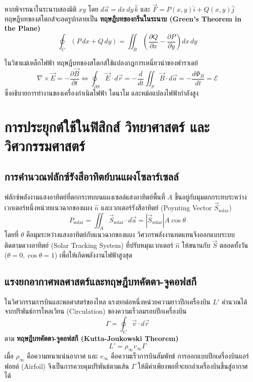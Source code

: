 หากพิจารณาในระนาบสองมิติ $xy$ โดย $d\vec{a} = dx\,dy\,\hat{k}$ และ $\vec{F} = P(x, y)\hat{i} + Q(x, y)\hat{j}$ ทฤษฎีบทของสโตกส์จะลดรูปกลายเป็น \textbf{ทฤษฎีบทของกรีนในระนาบ (Green's Theorem in the Plane)}
\begin{equation}
\oint_C (P\,dx + Q\,dy) = \iint_R \left(\frac{\partial Q}{\partial x} - \frac{\partial P}{\partial y}\right) dx\,dy
\end{equation}

ในวิชาแม่เหล็กไฟฟ้า ทฤษฎีบทของสโตกส์ใช้แปลงกฎการเหนี่ยวนำของฟาราเดย์
\begin{equation}
\nabla \times \vec{E} = -\frac{\partial \vec{B}}{\partial t} \iff \oint_{\partial S} \vec{E} \cdot d\vec{r} = -\frac{d}{dt}\iint_S \vec{B} \cdot d\vec{a} = -\frac{d\Phi_B}{dt} = \mathcal{E}
\end{equation}
ซึ่งอธิบายการทำงานของเครื่องกำเนิดไฟฟ้า ไดนาโม และหม้อแปลงไฟฟ้ากำลังสูง

\section{การประยุกต์ใช้ในฟิสิกส์ วิทยาศาสตร์ และวิศวกรรมศาสตร์}
\subsection{การคำนวณฟลักซ์รังสีอาทิตย์บนแผงโซลาร์เซลล์}
ฟลักซ์พลังงานแสงอาทิตย์ที่ตกกระทบบนแผงเซลล์แสงอาทิตย์พื้นที่ $A$ ขึ้นอยู่กับมุมตกกระทบระหว่างเวกเตอร์หนึ่งหน่วยแนวฉากของแผง $\hat{n}$ และเวกเตอร์รังสีอาทิตย์ (Poynting Vector $\vec{S}_{\text{solar}}$)
\begin{equation}
P_{\text{solar}} = \iint_A \vec{S}_{\text{solar}} \cdot d\vec{a} = |\vec{S}_{\text{solar}}| A \cos\theta
\end{equation}
โดยที่ $\theta$ คือมุมระหว่างแสงอาทิตย์กับแนวฉากของแผง วิศวกรพลังงานทดแทนจึงออกแบบระบบติดตามดวงอาทิตย์ (Solar Tracking System) ที่ปรับหมุนเวกเตอร์ $\hat{n}$ ให้ขนานกับ $\vec{S}$ ตลอดทั้งวัน ($\theta = 0, \cos\theta = 1$) เพื่อให้เกิดพลังงานไฟฟ้าสูงสุด

\subsection{แรงยกอากาศพลศาสตร์และทฤษฎีบทคัตตา-จูคอฟสกี}
ในวิศวกรรมการบินและพลศาสตร์ของไหล แรงยกต่อหนึ่งหน่วยความยาวปีกเครื่องบิน $L'$ คำนวณได้จากปริพันธ์การไหลเวียน (Circulation) ของความเร็วลมรอบปีกเครื่องบิน
\begin{equation}
\Gamma = \oint_C \vec{v} \cdot d\vec{r}
\end{equation}
ตาม \textbf{ทฤษฎีบทคัตตา-จูคอฟสกี (Kutta-Joukowski Theorem)}
\begin{equation}
L' = \rho_\infty v_\infty \Gamma
\end{equation}
เมื่อ $\rho_\infty$ คือความหนาแน่นอากาศ และ $v_\infty$ คือความเร็วการบินสัมพัทธ์ การออกแบบปีกเครื่องบินแอร์ฟอยล์ (Airfoil) จึงเป็นการควบคุมปริพันธ์ตามเส้น $\Gamma$ ให้มีค่าเพียงพอที่จะยกลำเครื่องบินขึ้นสู่อากาศได้

